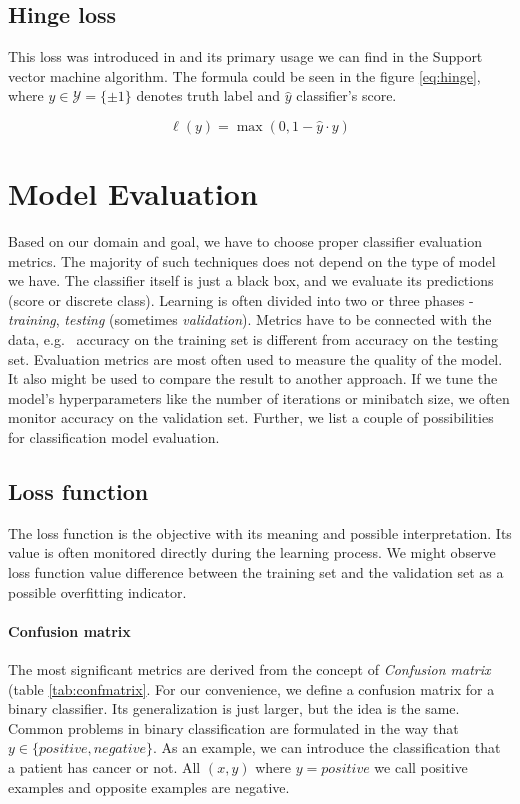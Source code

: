 \subsection{Hinge loss}
This loss was introduced in \cite{Gentile1998} and its primary usage we can find in the Support vector machine algorithm. The formula could be seen in the figure \ref{eq:hinge}, where $y\in\mathcal{Y}=\{\pm1\}$ denotes truth label and $\hat{y}$ classifier's score.

\begin{equation} \label{eq:hinge}
    \ell(y)=\max(0,1-\hat{y}\cdot y)
\end{equation}

\section{Model Evaluation}
Based on our domain and goal, we have to choose proper classifier evaluation metrics. The majority of such techniques does not depend on the type of model we have. The classifier itself is just a black box, and we evaluate its predictions (score or discrete class).
Learning is often divided into two or three phases - \emph{training}, \emph{testing} (sometimes \emph{validation}). Metrics have to be connected with the data, e.g. \ accuracy on the training set is different from accuracy on the testing set. 
Evaluation metrics are most often used to measure the quality of the model. It also might be used to compare the result to another approach. If we tune the model's hyperparameters like the number of iterations or minibatch size, we often monitor accuracy on the validation set. Further, we list a couple of possibilities for classification model evaluation.

\subsection{Loss function}
The loss function is the objective with its meaning and possible interpretation. Its value is often monitored directly during the learning process. We might observe loss function value difference between the training set and the validation set as a possible overfitting indicator.

\paragraph{Confusion matrix}
The most significant metrics are derived from the concept of \emph{Confusion matrix} (table \ref{tab:confmatrix}. For our convenience, we define a confusion matrix for a binary classifier. Its generalization is just larger, but the idea is the same. Common problems in binary classification are formulated in the way that $y \in \{positive, negative\}$. As an example, we can introduce the classification that a patient has cancer or not. All $(x,y)$ where $y=positive$ we call positive examples and opposite examples are negative.

